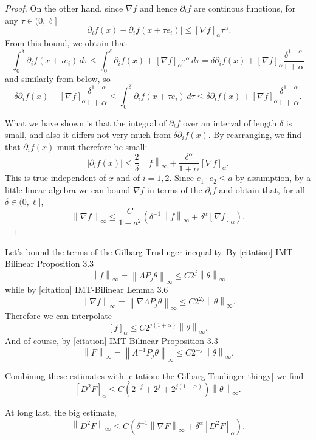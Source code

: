 \documentclass[11pt]{amsart}
\theoremstyle{remark}
\theoremstyle{definition}
\newcommand{\norm}[1]{\left\lVert#1\right\rVert}
\newcommand{\paren}[1]{\left( #1 \right)}
\newcommand{\bracket}[1]{\left[ #1 \right]}
\newcommand{\abs}[1]{\left\lvert #1 \right\rvert}
\newcommand{\del}{\partial}
\newcommand{\grad}{\nabla}
\newcommand{\n}{^{-1}}
\begin{document}
\begin{proof}
On the other hand, since $\grad f$ and hence $\del_i f$ are continous functions, for any $\tau \in (0,\ell]$
\[ \abs{\del_i f(x) - \del_i f(x+\tau e_i)} \leq \bracket{\grad f}_\alpha \tau^\alpha. \]
From this bound, we obtain that
\[ \int_0^\delta \del_i f(x + \tau e_i) \,d\tau \leq \int_0^\delta \del_i f(x) + \bracket{\grad f}_\alpha \tau^\alpha \,d\tau = \delta \del_i f(x) + \bracket{\grad f}_\alpha \frac{\delta^{1+\alpha}}{1+\alpha} \]
and similarly from below, so
\[ \delta \del_i f(x) - \bracket{\grad f}_\alpha \frac{\delta^{1+\alpha}}{1+\alpha} \leq \int_0^\delta \del_i f(x + \tau e_i) \,d\tau \leq \delta \del_i f(x) + \bracket{\grad f}_\alpha \frac{\delta^{1+\alpha}}{1+\alpha}. \]

What we have shown is that the integral of $\del_i f$ over an interval of length $\delta$ is small, and also it differs not very much from $\delta \del_i f(x)$.  By rearranging, we find that $\del_i f(x)$ must therefore be small:
\[ \abs{\del_i f(x)} \leq \frac{2}{\delta} \norm{f}_\infty + \frac{\delta^\alpha}{1+\alpha} \bracket{\grad f}_\alpha. \]
This is true independent of $x$ and of $i=1,2$.  Since $e_1 \cdot e_2 \leq a$ by assumption, by a little linear algebra we can bound $\grad f$ in terms of the $\del_i f$ and obtain that, for all $\delta \in (0,\ell]$,
\[ \norm{\grad f}_\infty \leq \frac{C}{1-a^2} \paren{ \delta\n \norm{f}_\infty + \delta^\alpha \bracket{\grad f}_\alpha }. \]

\end{proof}

Let's bound the terms of the Gilbarg-Trudinger inequality.  By [citation] IMT-Bilinear Proposition 3.3
\[ \norm{f}_\infty = \norm{\Lambda P_j \theta}_\infty \leq C 2^j \norm{\theta}_\infty \]
while by [citation] IMT-Bilinear Lemma 3.6
\[ \norm{\grad f}_\infty = \norm{\grad \Lambda P_j \theta}_\infty \leq C 2^{2j} \norm{\theta}_\infty. \]
Therefore we can interpolate
\[ \bracket{f}_\alpha \leq C 2^{j(1+\alpha)} \norm{\theta}_\infty. \]
And of course, by [citation] IMT-Bilinear Proposition 3.3
\[ \norm{F}_\infty = \norm{\Lambda^{-1} P_j \theta}_\infty \leq C 2^{-j} \norm{\theta}_\infty. \]

Combining these estimates with [citation: the Gilbarg-Trudinger thingy] we find
\[ \bracket{D^2 F}_\alpha \leq C \paren{2^{-j} + 2^j + 2^{j(1+\alpha)}} \norm{\theta}_\infty. \]

At long last, the big estimate,
\[ \norm{D^2 F}_\infty \leq C \paren{\delta\n \norm{\grad F}_\infty + \delta^{\alpha} \bracket{D^2 F}_\alpha}. \]
\end{document}
